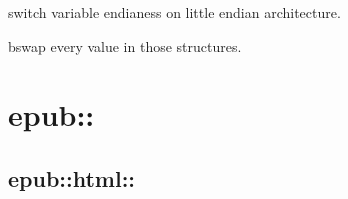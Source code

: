 \documentclass[letterpaper,10pt,english]{sphinxmanual}
\begin{document}

\begin{fulllineitems}
\label{functions:bswap__uint32_tR}
\end{fulllineitems}


\begin{fulllineitems}
\label{functions:bswap__uint64_tR}
switch variable endianess on little endian architecture.

\end{fulllineitems}


\begin{fulllineitems}
\label{functions:unretardify_header__st_palmdoc_dbR}
\end{fulllineitems}


\begin{fulllineitems}
\label{functions:unretardify_header__st_palmdocR}
\end{fulllineitems}


\begin{fulllineitems}
\label{functions:unretardify_header__st_mobiR}
bswap every value in those structures.

\end{fulllineitems}



\chapter{epub::}
\label{epub::doc}\label{epub:epub}

\section{epub::html::}
\label{tidyhtml::doc}\label{tidyhtml:epub-html}
\end{document}
